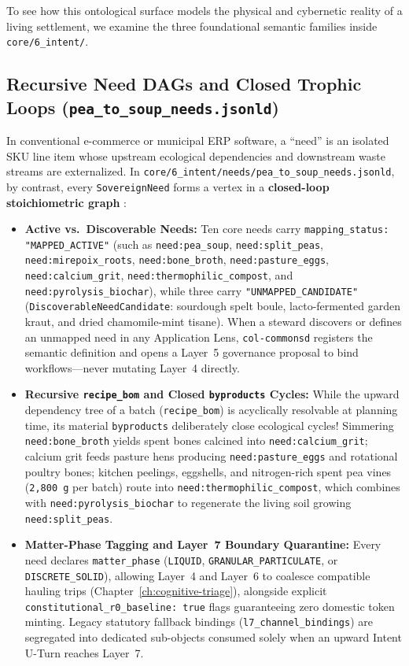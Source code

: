 To see how this ontological surface models the physical and cybernetic reality of a living settlement, we examine the three foundational semantic families inside \texttt{core/6\_intent/}.

\subsection{Recursive Need DAGs and Closed Trophic Loops (\texttt{pea\_to\_soup\_needs.jsonld})}

In conventional e-commerce or municipal ERP software, a ``need'' is an isolated SKU line item whose upstream ecological dependencies and downstream waste streams are externalized. In \texttt{core/6\_intent/needs/pea\_to\_soup\_needs.jsonld}, by contrast, every \texttt{SovereignNeed} forms a vertex in a \textbf{closed-loop stoichiometric graph} \parencite{georgescu1971}:
\begin{itemize}
    \item \textbf{Active vs.\ Discoverable Needs:} Ten core needs carry \texttt{mapping\_status: "MAPPED\_ACTIVE"} (such as \texttt{need:pea\_soup}, \texttt{need:split\_peas}, \texttt{need:mirepoix\_roots}, \texttt{need:bone\_broth}, \texttt{need:pasture\_eggs}, \texttt{need:calcium\_grit}, \texttt{need:thermophilic\_compost}, and \texttt{need:pyrolysis\_biochar}), while three carry \texttt{"UNMAPPED\_CANDIDATE"} (\texttt{DiscoverableNeedCandidate}: sourdough spelt boule, lacto-fermented garden kraut, and dried chamomile-mint tisane). When a steward discovers or defines an unmapped need in any Application Lens, \texttt{col-commonsd} registers the semantic definition and opens a Layer~5 governance proposal to bind workflows---never mutating Layer~4 directly.
    \item \textbf{Recursive \texttt{recipe\_bom} and Closed \texttt{byproducts} Cycles:} While the upward dependency tree of a batch (\texttt{recipe\_bom}) is acyclically resolvable at planning time, its material \texttt{byproducts} deliberately close ecological cycles! Simmering \texttt{need:bone\_broth} yields spent bones calcined into \texttt{need:calcium\_grit}; calcium grit feeds pasture hens producing \texttt{need:pasture\_eggs} and rotational poultry bones; kitchen peelings, eggshells, and nitrogen-rich spent pea vines (\texttt{2,800 g} per batch) route into \texttt{need:thermophilic\_compost}, which combines with \texttt{need:pyrolysis\_biochar} to regenerate the living soil growing \texttt{need:split\_peas}.
    \item \textbf{Matter-Phase Tagging and Layer~7 Boundary Quarantine:} Every need declares \texttt{matter\_phase} (\texttt{LIQUID}, \texttt{GRANULAR\_PARTICULATE}, or \texttt{DISCRETE\_SOLID}), allowing Layer~4 and Layer~6 to coalesce compatible hauling trips (Chapter~\ref{ch:cognitive-triage}), alongside explicit \texttt{constitutional\_r0\_baseline: true} flags guaranteeing zero domestic token minting. Legacy statutory fallback bindings (\texttt{l7\_channel\_bindings}) are segregated into dedicated sub-objects consumed solely when an upward Intent U-Turn reaches Layer~7.
\end{itemize}


